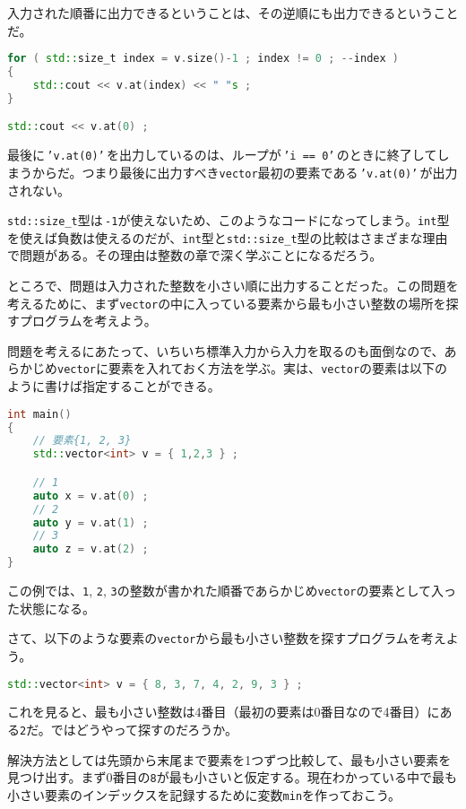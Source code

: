 入力された順番に出力できるということは、その逆順にも出力できるということだ。

\begin{lstlisting}[language={C++}]
for ( std::size_t index = v.size()-1 ; index != 0 ; --index )
{
    std::cout << v.at(index) << " "s ;
}

std::cout << v.at(0) ;
\end{lstlisting}

最後に\,\texttt{'v.at(0)'}\,を出力しているのは、ループが\,\texttt{'i == 0'}\,のときに終了してしまうからだ。つまり最後に出力すべき\texttt{vector}最初の要素である\,\texttt{'v.at(0)'}\,が出力されない。

\texttt{std::size\_t}型は\,\texttt{-1}が使えないため、このようなコードになってしまう。\texttt{int}型を使えば負数は使えるのだが、\texttt{int}型と\texttt{std::size\_t}型の比較はさまざまな理由で問題がある。その理由は整数の章で深く学ぶことになるだろう。

ところで、問題は入力された整数を小さい順に出力することだった。この問題を考えるために、まず\texttt{vector}の中に入っている要素から最も小さい整数の場所を探すプログラムを考えよう。

問題を考えるにあたって、いちいち標準入力から入力を取るのも面倒なので、あらかじめ\texttt{vector}に要素を入れておく方法を学ぶ。実は、\texttt{vector}の要素は以下のように書けば指定することができる。

\begin{lstlisting}[language={C++}]
int main()
{
    // 要素{1, 2, 3}
    std::vector<int> v = { 1,2,3 } ;

    // 1
    auto x = v.at(0) ;
    // 2
    auto y = v.at(1) ;
    // 3
    auto z = v.at(2) ;
}
\end{lstlisting}

この例では、\texttt{1}, \texttt{2}, \texttt{3}の整数が書かれた順番であらかじめ\texttt{vector}の要素として入った状態になる。

さて、以下のような要素の\texttt{vector}から最も小さい整数を探すプログラムを考えよう。

\begin{lstlisting}[language={C++}]
std::vector<int> v = { 8, 3, 7, 4, 2, 9, 3 } ;
\end{lstlisting}

これを見ると、最も小さい整数は4番目（最初の要素は0番目なので4番目）にある\texttt{2}だ。ではどうやって探すのだろうか。

解決方法としては先頭から末尾まで要素を1つずつ比較して、最も小さい要素を見つけ出す。まず0番目の\texttt{8}が最も小さいと仮定する。現在わかっている中で最も小さい要素のインデックスを記録するために変数\texttt{min}を作っておこう。

